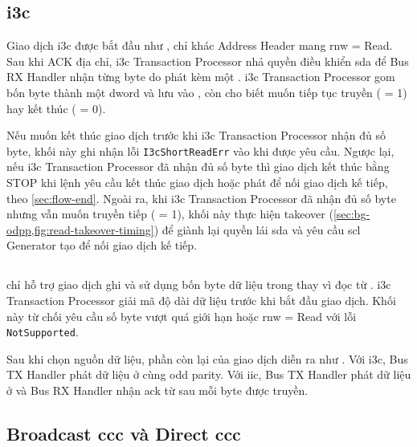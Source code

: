 \subsection{\texorpdfstring{\gls{i3c}}{I3C} \PrivateRead{}}

Giao dịch \gls{i3c} \PrivateRead{} được bắt đầu như \PrivateWrite{}, chỉ khác Address Header mang \gls{rnw} = Read. Sau khi \Target{} ACK địa chỉ, \gls{i3c} Transaction Processor nhả quyền điều khiển \gls{sda} để Bus RX Handler nhận từng byte do \Target{} phát kèm một \TBit{}. \gls{i3c} Transaction Processor gom bốn byte thành một \gls{dword} và lưu vào \RxFifo{}, còn \TBit{} cho biết \Target{} muốn tiếp tục truyền (\TBit{} = 1) hay kết thúc (\TBit{} = 0).

Nếu \Target{} muốn kết thúc giao dịch trước khi \gls{i3c} Transaction Processor nhận đủ số byte, khối này ghi nhận lỗi \texttt{I3cShortReadErr} vào \ResponseDescriptor{} khi được yêu cầu. Ngược lại, nếu \gls{i3c} Transaction Processor đã nhận đủ số byte thì giao dịch kết thúc bằng STOP khi lệnh yêu cầu kết thúc giao dịch hoặc phát \RepeatedSTART{} để nối giao dịch kế tiếp, theo \cref{sec:flow-end}. Ngoài ra, khi \gls{i3c} Transaction Processor đã nhận đủ số byte nhưng \Target{} vẫn muốn truyền tiếp (\TBit{} = 1), khối này thực hiện takeover (\cref{sec:bg-odpp,fig:read-takeover-timing}) để giành lại quyền lái \gls{sda} và yêu cầu \gls{scl} Generator tạo \RepeatedSTART{} để nối giao dịch kế tiếp.

\subsection{\ImmediateDataTransfer{}}

\ImmediateDataTransfer{} chỉ hỗ trợ giao dịch ghi và sử dụng bốn byte dữ liệu trong \CommandDescriptor{} thay vì đọc từ \TxFifo{}. \gls{i3c} Transaction Processor giải mã độ dài dữ liệu trước khi bắt đầu giao dịch. Khối này từ chối \CommandDescriptor{} yêu cầu số byte vượt quá giới hạn hoặc \gls{rnw} = Read với lỗi \texttt{NotSupported}.

Sau khi chọn nguồn dữ liệu, phần còn lại của giao dịch diễn ra như \PrivateWrite{}. Với \gls{i3c}, Bus
TX Handler phát dữ liệu ở \PushPull{} cùng \TBit{} odd parity. Với \gls{iic}, Bus TX
Handler phát dữ liệu ở \OpenDrain{} và Bus RX Handler nhận \gls{ack} từ \Target{} sau mỗi
byte được truyền.

\subsection{Broadcast \texorpdfstring{\gls{ccc}}{CCC} và Direct \texorpdfstring{\gls{ccc}}{CCC}}

